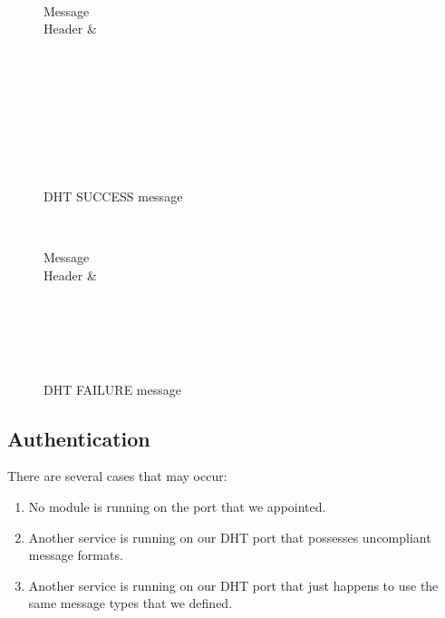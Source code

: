 \documentclass[a4paper, 11pt]{article}
\begin{document}
\begin{figure}[h!]
	\centering
	\begin{bytefield}[bitwidth=0.8em]{32}
		 \\
		\begin{rightwordgroup}{Message \\  Header}
			 & 
		\end{rightwordgroup} \\
		 \\
		\skippedwords \\
		 \\
		 \\
		\skippedwords \\
		 \\
	\end{bytefield}
	\caption{DHT SUCCESS message}
	\label{DHTSUCCESS}
\end{figure}

\begin{figure}[h!]
	\centering
	\begin{bytefield}[bitwidth=0.8em]{32}
		 \\
		\begin{rightwordgroup}{Message \\  Header}
			 & 
		\end{rightwordgroup} \\
		 \\
		\skippedwords \\
		 \\
	\end{bytefield}
	\caption{DHT FAILURE message}
	\label{DHTFAILURE}
\end{figure}

\subsection*{Authentication}



There are several cases that may occur:

\begin{enumerate}
	\item No module is running on the port that we appointed.
	\item Another service is running on our DHT port that possesses uncompliant message formats.
	\item Another service is running on our DHT port that just happens to use the same message types that we defined.
\end{enumerate}
\end{document}

